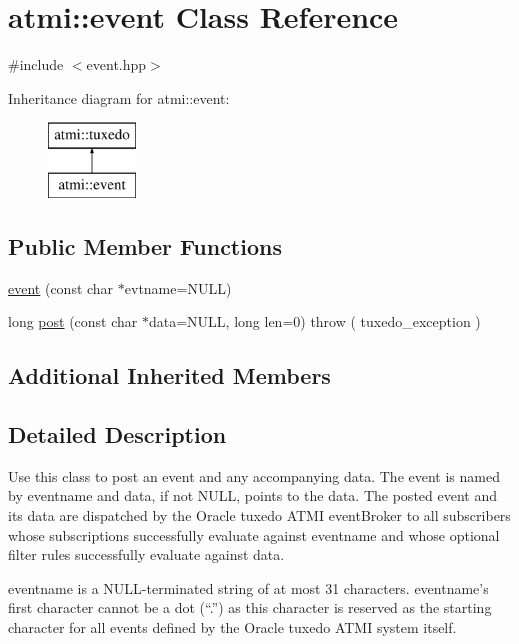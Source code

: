 \hypertarget{classatmi_1_1event}{\section{atmi\+:\+:event Class Reference}
\label{classatmi_1_1event}
}


{\ttfamily \#include $<$event.\+hpp$>$}

Inheritance diagram for atmi\+:\+:event\+:\begin{figure}[H]
\begin{center}
\leavevmode
\includegraphics[height=2.000000cm]{classatmi_1_1event}
\end{center}
\end{figure}
\subsection*{Public Member Functions}
\begin{DoxyCompactItemize}
\item 
\hyperlink{classatmi_1_1event_a64e8905f6b027d052074cb801567b1b3}{event} (const char $\ast$evtname=N\+U\+L\+L)
\item 
long \hyperlink{classatmi_1_1event_a0b1f1faae17aa923ce5a4a0d45cfcd07}{post} (const char $\ast$data=N\+U\+L\+L, long len=0)  throw ( tuxedo\+\_\+exception )
\end{DoxyCompactItemize}
\subsection*{Additional Inherited Members}


\subsection{Detailed Description}
Use this class to post an event and any accompanying data. The event is named by eventname and data, if not N\+U\+L\+L, points to the data. The posted event and its data are dispatched by the Oracle tuxedo A\+T\+M\+I event\+Broker to all subscribers whose subscriptions successfully evaluate against eventname and whose optional filter rules successfully evaluate against data.

eventname is a N\+U\+L\+L-\/terminated string of at most 31 characters. eventname’s first character cannot be a dot (“.\+”) as this character is reserved as the starting character for all events defined by the Oracle tuxedo A\+T\+M\+I system itself.

